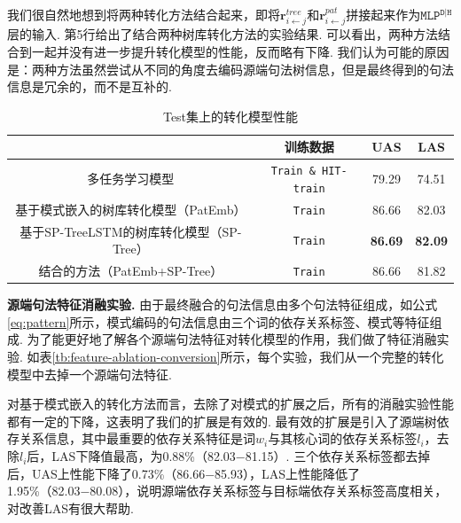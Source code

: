 我们很自然地想到将两种转化方法结合起来，即将$\mathbf{r}^{tree}_{i \leftarrow j}$和$\mathbf{r}^{pat}_{i \leftarrow j}$拼接起来作为$\texttt{MLP}^{\texttt{D|H}}$层的输入. 第5行给出了结合两种树库转化方法的实验结果. 可以看出，两种方法结合到一起并没有进一步提升转化模型的性能，反而略有下降. 我们认为可能的原因是：两种方法虽然尝试从不同的角度去编码源端句法树信息，但是最终得到的句法信息是冗余的，而不是互补的.
\begin{table}[hb!]
    \centering
    \caption{Test集上的转化模型性能}
    \label{tb:HIT-conversion-rst}
    \begin{tabular}{c c c c}%
        \toprule
                                                 & 训练数据                    & UAS            & LAS            \\ %
        \midrule
        多任务学习模型                           & \texttt{Train \& HIT-train} & 79.29          & 74.51          \\
        \midrule
        基于模式嵌入的树库转化模型（PatEmb）     & \texttt{Train}              & 86.66          & 82.03          \\
        基于SP-TreeLSTM的树库转化模型（SP-Tree） & \texttt{Train}              & \textbf{86.69} & \textbf{82.09} \\
        结合的方法（PatEmb+SP-Tree）             & \texttt{Train}              & 86.66          & 81.82          \\
        \bottomrule
    \end{tabular}
\end{table}

\textbf{源端句法特征消融实验.  }
由于最终融合的句法信息由多个句法特征组成，如公式\ref{eq:pattern}所示，模式编码的句法信息由三个词的依存关系标签、模式等特征组成. 为了能更好地了解各个源端句法特征对转化模型的作用，我们做了特征消融实验. 如表\ref{tb:feature-ablation-conversion}所示，每个实验，我们从一个完整的转化模型中去掉一个源端句法特征.

对基于模式嵌入的转化方法而言，去除了对模式的扩展之后，所有的消融实验性能都有一定的下降，这表明了我们的扩展是有效的.
最有效的扩展是引入了源端树依存关系信息，其中最重要的依存关系特征是词$w_i$与其核心词的依存关系标签$l_i$，去除$l_i$后，LAS下降值最高，为0.88\%（82.03−81.15）.
三个依存关系标签都去掉后，UAS上性能下降了0.73\%（86.66−85.93），LAS上性能降低了1.95\%（82.03−80.08），说明源端依存关系标签与目标端依存关系标签高度相关，对改善LAS有很大帮助.

